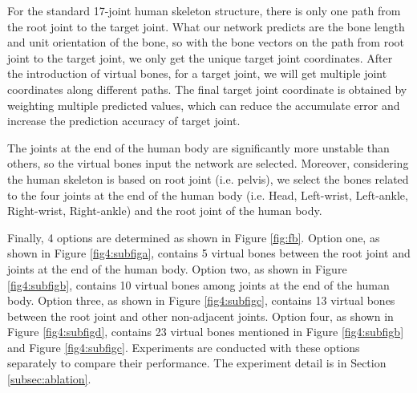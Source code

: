 \documentclass[journal]{IEEEtran}
\begin{document}
\begin{figure*}
	\centering
	\vspace{-0pt}
	\vspace{-3pt}
	\caption{Schematic diagram of virtual bones added to the network. (a) 5 bones from pelvis to the joints at the end of the human body. (b) 10 bones between the joints at the end of the human body. (c) 13 bones from pelvis to every non-adjacent joint. (d) 23 bones, the combination of (b) and (c).}
	\vspace{-0pt}
	\label{fig:fb}
\end{figure*}

{For the standard 17-joint human skeleton structure, there is only one path from the root joint to the target joint. What our network predicts are the bone length and unit orientation of the bone, so with the bone vectors on the path from root joint to the target joint, we only get the unique target joint coordinates. After the introduction of virtual bones, for a target joint, we will get multiple joint coordinates along different paths. The final target joint coordinate is obtained by weighting multiple predicted values, which can reduce the accumulate error and increase the prediction accuracy of target joint.}

The joints at the end of the human body are significantly more unstable than others\cite{2020Deep}, so the virtual bones input the network are selected. Moreover, considering the human skeleton is based on root joint (i.e. pelvis), we select the bones related to the four joints at the end of the human body (i.e. Head, Left-wrist, Left-ankle, Right-wrist, Right-ankle) and the root joint of the human body. 

Finally, 4 options are determined as shown in Figure \ref{fig:fb}. Option one, as shown in Figure \ref{fig4:subfiga}, contains 5 virtual bones between the root joint and joints at the end of the human body.  Option two, as shown in Figure \ref{fig4:subfigb}, contains 10 virtual bones among joints at the end of the human body. Option three, as shown in Figure \ref{fig4:subfigc}, contains 13 virtual bones between the root joint and other non-adjacent joints. Option four, as shown in Figure \ref{fig4:subfigd}, contains 23 virtual bones mentioned in Figure \ref{fig4:subfigb} and Figure \ref{fig4:subfigc}. Experiments are conducted with these options separately to compare their performance. The experiment detail is in Section \ref{subsec:ablation}.
\end{document}
